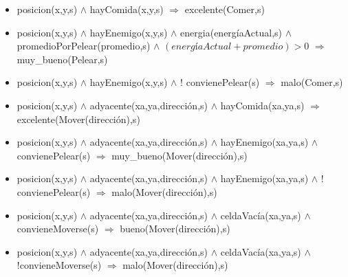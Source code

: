 \begin{itemize}

\item posicion(x,y,s) $\land$ hayComida(x,y,s) $\Rightarrow$ excelente(Comer,s)

\item posicion(x,y,s) $\land$ hayEnemigo(x,y,s) $\land$ energia(energíaActual,s)
$\land$ promedioPorPelear(promedio,s) $\land$ $(energíaActual + promedio) > 0$
$\Rightarrow$ \linebreak muy\_bueno(Pelear,s)

\item posicion(x,y,s) $\land$ hayEnemigo(x,y,s) $\land$ ! convienePelear(s)
$\Rightarrow$ malo(Comer,s)

\item posicion(x,y,s) $\land$ adyacente(xa,ya,dirección,s) $\land$
hayComida(xa,ya,s) $\Rightarrow$ excelente(Mover(dirección),s)

\item posicion(x,y,s) $\land$ adyacente(xa,ya,dirección,s) $\land$
hayEnemigo(xa,ya,s)  $\land$ convienePelear(s) $\Rightarrow$
muy\_bueno(Mover(dirección),s)

\item posicion(x,y,s) $\land$ adyacente(xa,ya,dirección,s) $\land$
hayEnemigo(xa,ya,s) $\land$ ! convienePelear(s)
$\Rightarrow$ malo(Mover(dirección),s)

\item posicion(x,y,s) $\land$ adyacente(xa,ya,dirección,s) $\land$
celdaVacía(xa,ya,s) $\land$ convieneMoverse(s) $\Rightarrow$
bueno(Mover(dirección),s)

\item posicion(x,y,s) $\land$ adyacente(xa,ya,dirección,s) $\land$
celdaVacía(xa,ya,s) $\land$ !convieneMoverse(s)
$\Rightarrow$ malo(Mover(dirección),s)

\end{itemize}

